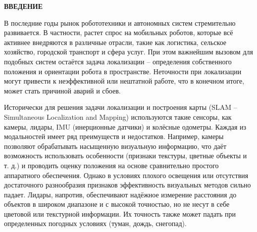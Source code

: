 



\newpage
\renewcommand{\contentsname}{\centerline{\large СОДЕРЖАНИЕ}}
\tableofcontents

\newpage
\begin{center}
  \textbf{\large ВВЕДЕНИЕ}
\end{center}

В последние годы рынок робототехники и автономных систем стремительно развивается. В частности, растет спрос на мобильных роботов, 
которые всё активнее внедряются в различные отрасли, такие как логистика, сельское хозяйство, городской транспорт и сфера услуг. 
При этом важнейшим вызовом для подобных систем остаётся задача локализации – определения собственного положения и ориентации робота в пространстве. 
Неточности при локализации могут привести к неэффективной или нештатной работе, что в конечном итоге, может стать причиной аварий и сбоев.

Исторически для решения задачи локализации и построения карты (SLAM – Simultaneous Localization and Mapping) используются такие сенсоры, 
как камеры, лидары, IMU (инерционные датчики) и колёсные одометры. Каждая из модальностей имеет ряд преимуществ и недостатков. Например, 
камеры позволяют обрабатывать насыщенную визуальную информацию, что даёт возможность использовать особенности (признаки текстуры, цветные объекты и т. д.) 
и проводить оценку положения на основе сравнительно простого аппаратного обеспечения. Однако в условиях плохого освещения или отсутствия достаточного 
разнообразия признаков эффективность визуальных методов сильно падает. Лидары, напротив, обеспечивают надёжное измерение расстояния 
до объектов в широком диапазоне и с высокой точностью, но не несут в себе цветовой или текстурной информации. Их точность также может падать при определенных погодных условиях (туман, дождь, снегопад).

